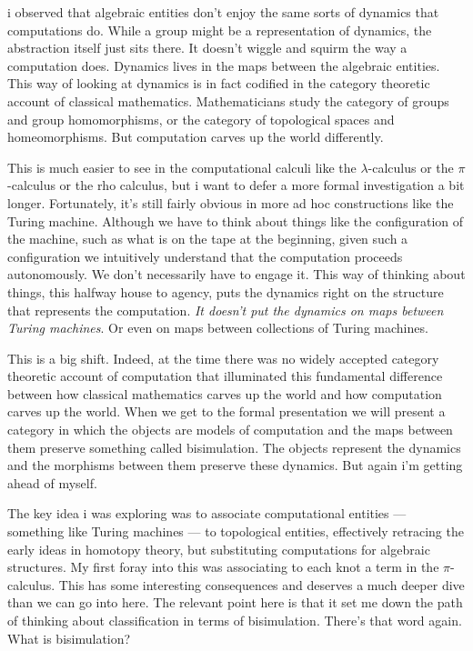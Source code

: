 i observed that algebraic entities don't enjoy the same sorts of dynamics that computations do. While a group might be a representation of dynamics, the abstraction itself just sits there. It doesn't wiggle and squirm the way a computation does. Dynamics lives in the maps between the algebraic entities. This way of looking at dynamics is in fact codified in the category theoretic account of classical mathematics. Mathematicians study the category of groups and group homomorphisms, or the category of topological spaces and homeomorphisms. But computation carves up the world differently. 

This is much easier to see in the computational calculi like the $\lambda$-calculus or the $\pi$-calculus or the rho calculus, but i want to defer a more formal investigation a bit longer. Fortunately, it's still fairly obvious in more ad hoc constructions like the Turing machine. Although we have to think about things like the configuration of the machine, such as what is on the tape at the beginning, given such a configuration we intuitively understand that the computation proceeds autonomously. We don't necessarily have to engage it. This way of thinking about things, this halfway house to agency, puts the dynamics right on the structure that represents the computation. \emph{It doesn't put the dynamics on maps between Turing machines}. Or even on maps between collections of Turing machines. 

This is a big shift. Indeed, at the time there was no widely accepted category theoretic account of computation that illuminated this fundamental difference between how classical mathematics carves up the world and how computation carves up the world. When we get to the formal presentation we will present a category in which the objects are models of computation and the maps between them preserve something called bisimulation. The objects represent the dynamics and the morphisms between them preserve these dynamics. But again i'm getting ahead of myself.

The key idea i was exploring was to associate computational entities --- something like Turing machines --- to topological entities, effectively retracing the early ideas in homotopy theory, but substituting computations for algebraic structures. My first foray into this was associating to each knot a term in the $\pi$-calculus. This has some interesting consequences and deserves a much deeper dive than we can go into here. The relevant point here is that it set me down the path of thinking about classification in terms of bisimulation. There's that word again. What is bisimulation?

